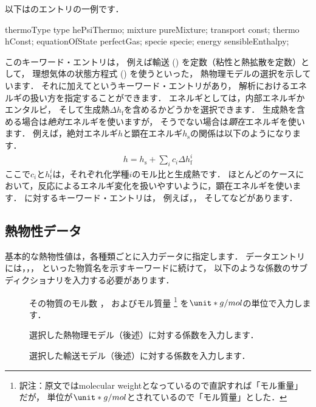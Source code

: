 以下はのエントリの一例です．
\begin{OFverbatim}[file]
thermoType
{
    type            hePsiThermo;
    mixture         pureMixture;
    transport       const;
    thermo          hConst;
    equationOfState perfectGas;
    specie          specie;
    energy          sensibleEnthalpy;
}
\end{OFverbatim}
このキーワード・エントリは，
例えば輸送 () を定数（粘性と熱拡散を定数）として，
理想気体の状態方程式 () を使うといった，
熱物理モデルの選択を示しています．
それに加えてというキーワード・エントリがあり，
解析におけるエネルギの扱い方を指定することができます．
エネルギとしては，内部エネルギかエンタルピ，
そして生成熱$\Delta h_{\mathrm{f}}$を含めるかどうかを選択できます．
生成熱を含める場合は\emph{絶対}エネルギを使いますが，
そうでない場合は\emph{顕在}エネルギを使います．
例えば，絶対エネルギ$h$と顕在エネルギ$h_{\mathrm{s}}$の関係は以下のようになります．
\begin{align}
 \label{eq:7.1@2.2.0}
 h = h_{\mathrm{s}} + \sum_{i}c_{i}\Delta h_{\mathrm{f}}^{i}
\end{align}
ここで$c_{i}$と$h_{\mathrm{f}}^{i}$は，それぞれ化学種$i$のモル比と生成熱です．
ほとんどのケースにおいて，反応によるエネルギ変化を扱いやすいように，顕在エネルギを使います．
に対するキーワード・エントリは，
例えば，，
そしてなどがあります．


\subsection{熱物性データ}
\label{ssec:7.1.1}
基本的な熱物性値は，各種類ごとに入力データに指定します．
データエントリには，，，
といった物質名を示すキーワードに続けて，
以下のような係数のサブディクショナリを入力する必要があります．
\begin{description}
 \item[]
%
%
            その物質のモル数
%
%
            ，
            およびモル質量%
\footnote{訳注：原文ではmolecular weightとなっているので直訳すれば「モル重量」だが，
            単位が$\unit*{g/mol}$とされているので「モル質量」とした．}%
%
%
            を$\unit*{g/mol}$の単位で入力します．
%
%
 \item[] 選択した熱物理モデル（後述）に対する係数を入力します．
%
%
 \item[] 選択した輸送モデル（後述）に対する係数を入力します．
\end{description}


